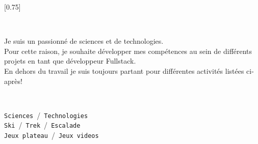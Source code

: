 \documentclass[lighthipster]{simplehipstercv}
\begin{document}
\setlength{\columnsep}{0.05\paperwidth}
[0.75]
\begin{paracol}{2}

\paracolbackgroundoptions

\footnotesize
{\setasidefontcolour
\flushleft


\\[0.5em]
{\footnotesize
\begin{adjustwidth}{0.02\paperwidth}{}
    Je suis un passionné de sciences et de technologies.\\
    Pour cette raison, je souhaite développer mes compétences au sein de différents projets en tant que développeur Fullstack.\\
    En dehors du travail je suis toujours partant pour différentes activités listées ci-après!
    \end{adjustwidth}
    }
\bigskip
\vspace{4em}

\\[0.5em]
\begin{adjustwidth}{0.02\paperwidth}{}
\texttt{Sciences}~/~\texttt{Technologies} \\
\texttt{Ski}~/~\texttt{Trek}~/~\texttt{Escalade}\\
\texttt{Jeux plateau}~/~\texttt{Jeux videos}
\end{adjustwidth}
\bigskip
\vspace{4em}

\\[0.5em]
\\
\\
\\
\\

}
\end{paracol}
\end{document}
